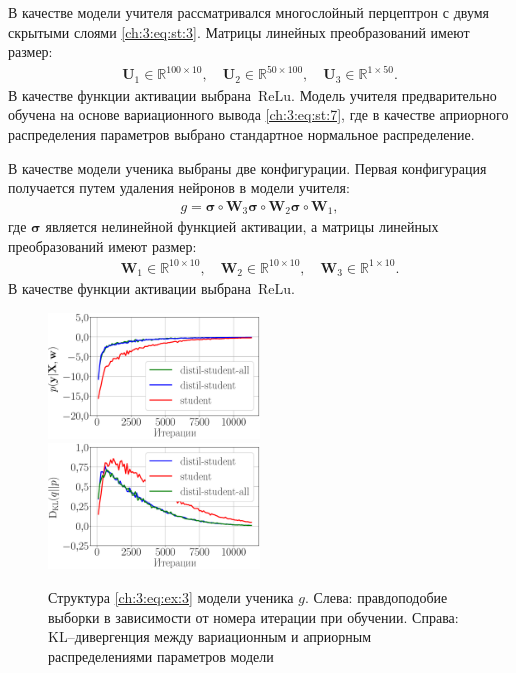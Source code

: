 В качестве модели учителя рассматривался многослойный перцептрон с двумя скрытыми слоями \eqref{ch:3:eq:st:3}. Матрицы линейных преобразований имеют размер:
\[
\label{ch:3:eq:ex:2}
\begin{aligned}
\mathbf{U}_{1} \in \mathbb{R}^{100 \times 10}, \quad \mathbf{U}_{2} \in \mathbb{R}^{50 \times 100}, \quad \mathbf{U}_{3} \in \mathbb{R}^{1 \times 50}.
\end{aligned}
\]
В качестве функции активации выбрана~$\text{ReLu}$.
Модель учителя предварительно обучена на основе вариационного вывода \eqref{ch:3:eq:st:7}, где в качестве априорного распределения параметров выбрано стандартное нормальное распределение.

В качестве модели ученика выбраны две конфигурации. Первая конфигурация получается путем удаления нейронов в модели учителя:
\[
\label{ch:3:eq:ex:3}
\begin{aligned}
g = \bm{\sigma} \circ \mathbf{W}_3\bm{\sigma} \circ \mathbf{W}_2\bm{\sigma} \circ \mathbf{W}_1,
\end{aligned}
\]
где $\bm{\sigma}$ является нелинейной функцией активации, а матрицы линейных преобразований имеют размер:
\[
\label{ch:3:eq:ex:4}
\begin{aligned}
\mathbf{W}_{1} \in \mathbb{R}^{10 \times 10}, \quad \mathbf{W}_{2} \in \mathbb{R}^{10 \times 10},  \quad \mathbf{W}_{3} \in \mathbb{R}^{1 \times 10}.
\end{aligned}
\]
В качестве функции активации выбрана~$\text{ReLu}$.

\begin{figure}[h!]
\includegraphics[width=0.5\textwidth]{results/bayesdistil/synthetic_likelihood_3_layers.eps}
\includegraphics[width=0.5\textwidth]{results/bayesdistil/synthetic_D_KL_3_layers.eps}
\caption{Структура \eqref{ch:3:eq:ex:3} модели ученика $g$. Слева: правдоподобие выборки в зависимости от номера итерации при обучении. Справа: KL--дивергенция между вариационным и априорным распределениями параметров модели}
\label{ch:3:exp:fig1}
\end{figure}

